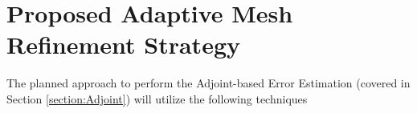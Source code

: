 \documentclass[titlepage,11pt,letterpaper]{article}
\numberwithin{equation}{subsection}
\begin{document}
\section{Proposed Adaptive Mesh Refinement Strategy}

The planned approach to perform the Adjoint-based Error Estimation (covered in Section \ref{section:Adjoint}) will utilize the following techniques



















\newpage


\newpage


\end{document}
